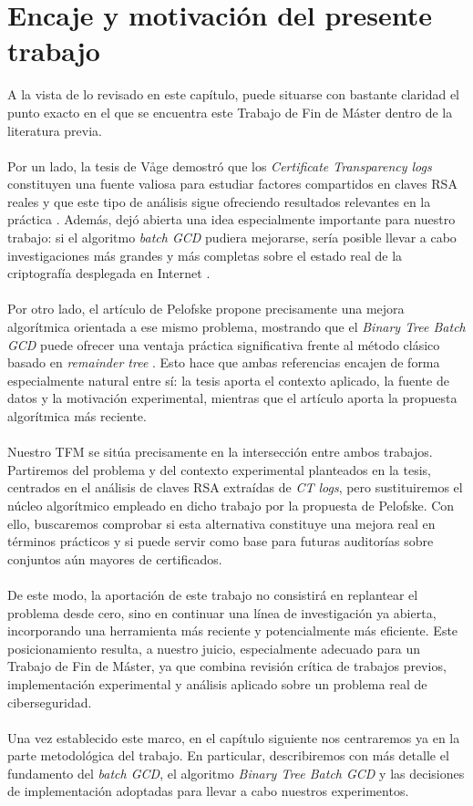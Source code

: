 \section{Encaje y motivación del presente trabajo}

A la vista de lo revisado en este capítulo, puede situarse con bastante claridad el punto exacto en el que se encuentra este Trabajo de Fin de Máster dentro de la literatura previa.
\\
\\
Por un lado, la tesis de Våge demostró que los \textit{Certificate Transparency logs} constituyen una fuente valiosa para estudiar factores compartidos en claves RSA reales y que este tipo de análisis sigue ofreciendo resultados relevantes en la práctica \cite{vage2022finding}. Además, dejó abierta una idea especialmente importante para nuestro trabajo: si el algoritmo \textit{batch GCD} pudiera mejorarse, sería posible llevar a cabo investigaciones más grandes y más completas sobre el estado real de la criptografía desplegada en Internet \cite{vage2022finding}.
\\
\\
Por otro lado, el artículo de Pelofske propone precisamente una mejora algorítmica orientada a ese mismo problema, mostrando que el \textit{Binary Tree Batch GCD} puede ofrecer una ventaja práctica significativa frente al método clásico basado en \textit{remainder tree} \cite{pelofske2024efficient}. Esto hace que ambas referencias encajen de forma especialmente natural entre sí: la tesis aporta el contexto aplicado, la fuente de datos y la motivación experimental, mientras que el artículo aporta la propuesta algorítmica más reciente.
\\
\\
Nuestro TFM se sitúa precisamente en la intersección entre ambos trabajos. Partiremos del problema y del contexto experimental planteados en la tesis, centrados en el análisis de claves RSA extraídas de \textit{CT logs}, pero sustituiremos el núcleo algorítmico empleado en dicho trabajo por la propuesta de Pelofske. Con ello, buscaremos comprobar si esta alternativa constituye una mejora real en términos prácticos y si puede servir como base para futuras auditorías sobre conjuntos aún mayores de certificados.
\\
\\
De este modo, la aportación de este trabajo no consistirá en replantear el problema desde cero, sino en continuar una línea de investigación ya abierta, incorporando una herramienta más reciente y potencialmente más eficiente. Este posicionamiento resulta, a nuestro juicio, especialmente adecuado para un Trabajo de Fin de Máster, ya que combina revisión crítica de trabajos previos, implementación experimental y análisis aplicado sobre un problema real de ciberseguridad.
\\
\\
Una vez establecido este marco, en el capítulo siguiente nos centraremos ya en la parte metodológica del trabajo. En particular, describiremos con más detalle el fundamento del \textit{batch GCD}, el algoritmo \textit{Binary Tree Batch GCD} y las decisiones de implementación adoptadas para llevar a cabo nuestros experimentos.